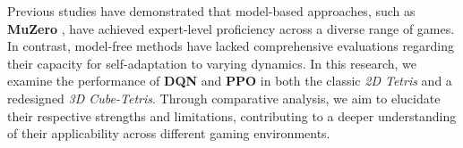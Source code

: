 Previous studies have demonstrated that model-based approaches, such as \textbf{MuZero} \cite{Schrittwieser2020}, 
have achieved expert-level proficiency across a diverse range of games. 
In contrast, model-free methods have lacked comprehensive evaluations regarding their capacity for self-adaptation to varying dynamics. 
In this research, we examine the performance of \textbf{DQN} and \textbf{PPO} in both the classic \emph{2D Tetris} and a redesigned
 \emph{3D Cube-Tetris}. 
 Through comparative analysis, we aim to elucidate their respective strengths and limitations, contributing to a deeper understanding of 
 their applicability across different gaming environments.